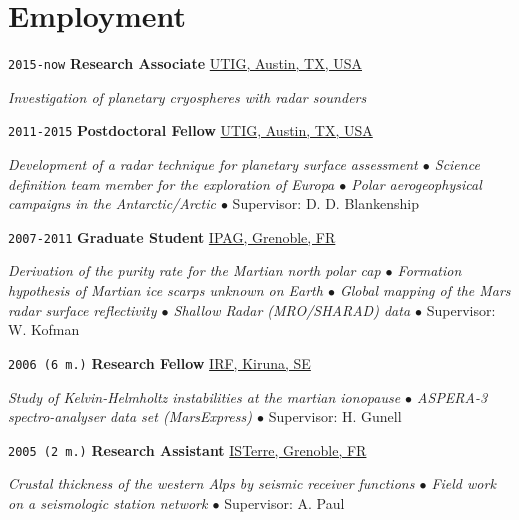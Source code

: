 
\section*{Employment}

\TabPositions{7em,27em}

\noindent \texttt{2015-now} \tab \textbf{Research Associate} \tab
\href{https://www.ig.utexas.edu/}{UTIG, Austin, TX, USA}
\begin{adjustwidth}{7em}{}
\textit{Investigation of planetary cryospheres with radar sounders}
\end{adjustwidth}
\vspace{.5em}

\noindent \texttt{2011-2015} \tab \textbf{Postdoctoral Fellow} \tab
\href{https://www.ig.utexas.edu/}{UTIG, Austin, TX, USA}
\begin{adjustwidth}{7em}{}
\textit{Development of a radar technique for planetary surface assessment $\bullet$ Science definition team member for the exploration of Europa $\bullet$ Polar aerogeophysical campaigns in the Antarctic/Arctic $\bullet$} Supervisor: D. D. Blankenship
\end{adjustwidth}
\vspace{.5em}

\noindent \texttt{2007-2011} \tab \textbf{Graduate Student} \tab
\href{http://ipag.osug.fr/}{IPAG, Grenoble, FR}
\vspace{.3em}
\begin{adjustwidth}{7em}{}
\textit{Derivation of the purity rate for the Martian north polar cap $\bullet$ Formation hypothesis of Martian ice scarps unknown on Earth $\bullet$ Global mapping of the Mars radar surface reflectivity $\bullet$ Shallow Radar (MRO/SHARAD) data $\bullet$} Supervisor: W. Kofman
\end{adjustwidth}
\vspace{.5em}

\noindent \texttt{2006 (6 m.)} \tab \textbf{Research Fellow} \tab
\href{https://www2.irf.se/}{IRF, Kiruna, SE}
\vspace{.3em}
\begin{adjustwidth}{7em}{}
\textit{Study of Kelvin-Helmholtz instabilities at the martian ionopause $\bullet$ ASPERA-3 spectro-analyser data set (MarsExpress) $\bullet$} Supervisor: H. Gunell
\end{adjustwidth}
\vspace{.5em}

\noindent \texttt{2005 (2 m.)} \tab \textbf{Research Assistant} \tab
\href{https://www.isterre.fr/}{ISTerre, Grenoble, FR}
\vspace{.3em}
\begin{adjustwidth}{7em}{}
\textit{Crustal thickness of the western Alps by seismic receiver functions $\bullet$ Field work on a seismologic station network $\bullet$} Supervisor: A. Paul
\end{adjustwidth}
\vspace{.5em}


